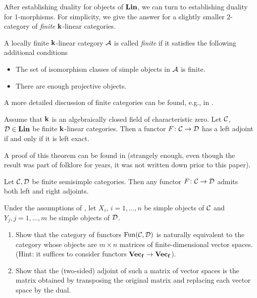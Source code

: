  After establishing duality for objects of $\mathbf{Lin}$, we can turn to establishing
 duality for 1-morphisms. For simplicity, we give the answer for a slightly
 smaller 2-category of \emph{finite} $\mathbf{k}$-linear categories.

 \begin{definition}\label{d:finite}
    A locally finite $\mathbf{k}$-linear category $\mathcal{A}$ is called \emph{finite} if
    it satisfies the following additional conditions
    \begin{itemize}
      \item The set of isomorphism classes of simple objects in $\mathcal{A}$ is
        finite.
      \item There are enough projective objects.
    \end{itemize}
\end{definition}
A more detailed discussion of finite categories can be found, e.g., in
\cite[Section 1.8]{etingof-fusion}.

 \begin{theorem}\label{t:exact-adjoint}
  Assume that $\mathbf{k}$ is an algebraically closed field of characteristic zero. Let
  $\mathcal{C}$, $\mathcal{D}\in \mathbf{Lin}$ be finite $\mathbf{k}$-linear categories. Then a functor
  $F\colon \mathcal{C}\to \mathcal{D}$ has a left adjoint if and only if it is left exact.
\end{theorem}
A proof of this theorem can be found in \cite[Proposition 1.7]{dsps-balanced}
(strangely enough, even though the result was part of folklore for years, it was
not written down prior to this paper).

\begin{corollary}\label{c:adjoint-semisimple}
  Let $\mathcal{C}, \mathcal{D}$ be finite semisimple categories. Then any functor $F\colon
  \mathcal{C}\to \mathcal{D}$ admits both left and right adjoints.
\end{corollary}

\begin{exercise}\label{ec:adjoint-semisimple}
  Under the assumptions of , let $X_i$, $i=1, \dots,
  n$ be simple objects of $\mathcal{C}$ and $Y_j, j=1, \dots, m$ be simple objects of
  $\mathcal{D}$.

  \begin{enumerate}
    \item Show that the category of functors $\operatorname{Fun}(\mathcal{C}, \mathcal{D})$ is naturally
      equivalent to the category whose objects are $m\times n$ matrices of
    finite-dimensional vector spaces. (Hint: it suffices to consider functors
    $\mathbf{Vec_f}\to \mathbf{Vec_f}$).

    \item Show that the (two-sided) adjoint of such a matrix of vector spaces is
    the matrix obtained by transposing the original matrix and replacing each
    vector space by the dual.
  \end{enumerate}
\end{exercise}


